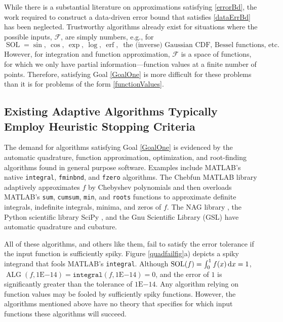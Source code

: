 \documentclass[11pt]{NSFamsart}
\DeclareMathOperator{\erf}{erf}
\DeclareMathOperator{\SOL}{SOL}
\DeclareMathOperator{\ALG}{ALG}
\def\dif{\textup{d}}
\newcommand{\calf}{{\mathcal{F}}}
\begin{document}
While there is a substantial literature on approximations satisfying \eqref{errorBd}, the work required to construct a data-driven error bound that satisfies \eqref{dataErrBd} has been neglected. 
Trustworthy algorithms already exist for situations where the possible inputs, $\calf$, are simply numbers, e.g., for 
\begin{equation} \label{functionValues}
    \SOL = \sin,\ \cos, \ \exp, \ \log, \ \erf, \ \text{ the (inverse) Gaussian CDF, Bessel functions, etc.}
\end{equation}
However, for integration and function approximation, $\calf$ is a space of functions, for which we only have partial information---function values at a finite number of points.  Therefore, satisfying Goal \ref{GoalOne} is more difficult for these problems than it is for problems of the form \eqref{functionValues}.

\subsection{Existing Adaptive Algorithms Typically Employ Heuristic Stopping Criteria} \label{sec:Heuristics}
The demand for algorithms satisfying Goal \ref{GoalOne} is evidenced by the automatic quadrature, function approximation, optimization, and root-finding algorithms found in general purpose software.  Examples include MATLAB's \cite{MAT9.5} native \texttt{integral}, \texttt{fminbnd}, and \texttt{fzero} algorithms.  The Chebfun \cite{TrefEtal17a} MATLAB library adaptively approximates $f$ by Chebyshev polynomials and then overloads MATLAB's \texttt{sum}, \texttt{cumsum}, \texttt{min}, and \texttt{roots} functions to approximate definite integrals, indefinite integrals, minima, and zeros of $f$.  The  NAG library \citep{NAG23}, the Python scientific library SciPy \cite{SCIPY}, and the Gnu Scientific Library (GSL) \cite{GSL} have automatic quadrature and cubature. 

All of these algorithms, and others like them, fail to satisfy the error tolerance if the input function is sufficiently spiky.  Figure \ref{quadfailfig}a) depicts a spiky integrand that fools MATLAB's \texttt{integral}.  Although $\SOL(f) = \int_0^1 f(x) \, \dif x = 1$, $\ALG(f,1\text{E}{-14}) = \texttt{integral}(f,1\text{E}{-14}) = 0$, and the error of $1$ is significantly greater than the tolerance of $1\text{E}{-14}$.  Any algorithm relying on function values may be fooled by sufficiently spiky functions.  However, the algorithms mentioned above have no theory that specifies for which input functions these algorithms will succeed.
\end{document}
